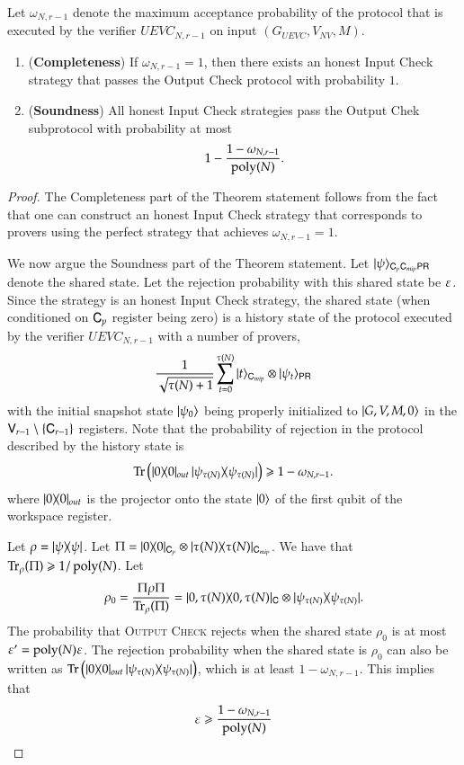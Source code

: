 \begin{lemma}	
\label{lem:output_check}
Let $\omega_{N,r-1}$ denote the maximum acceptance probability of the protocol that is executed by the verifier $UEVC_{N,r-1}$ on input $(G_{UEVC},V_{NV},M)$. 
\begin{enumerate}
	\item (\textbf{Completeness}) If $\omega_{N,r-1} = 1$, then there exists an honest Input Check strategy that passes the Output Check protocol with probability $1$.
	
	\item (\textbf{Soundness}) All honest Input Check strategies pass the Output Chek subprotocol with probability at most 
\[
	1 - \frac{1 - \omega_{N,r-1}}{\operatorname{poly}(N)}.
\] 
\end{enumerate}
\end{lemma}
\begin{proof}
The Completeness part of the Theorem statement follows from the fact that one can construct an honest Input Check strategy that corresponds to provers using the perfect strategy that achieves $\omega_{N,r-1} = 1$.

We now argue the Soundness part of the Theorem statement. Let $|\psi\rangle_{{\mathsf{C}}_p {\mathsf{C}}_{mip} {\mathsf{P}} {\mathsf{R}}}$ denote the shared state. Let the rejection probability with this shared state be $\varepsilon$. Since the strategy is an honest Input Check strategy, the shared state (when conditioned on ${\mathsf{C}}_p$ register being zero) is a history state of the protocol executed by the verifier $UEVC_{N,r-1}$ with a number of provers,
\[
\frac{1}{\sqrt{\tau(N) + 1}} \sum_{t = 0}^{\tau(N)} |t\rangle_{{\mathsf{C}}_{mip}} \otimes |\psi_t\rangle_{{\mathsf{P}} {\mathsf{R}}}
\]
with the initial snapshot state $|\psi_0\rangle$ being properly initialized to $|G,V,M,0\rangle$ in the ${\mathsf{V}}_{r-1} \setminus \{ {\mathsf{C}}_{r-1} \}$ registers. Note that the probability of rejection in the protocol described by the history state is 
\[
	\operatorname{Tr} \left ( |0\rangle\! \langle 0|_{out} \, |\psi_{\tau(N)}\rangle\! \langle \psi_{\tau(N)}| \right) \geqslant 1 - \omega_{N,r-1}.
\]
where $|0\rangle\! \langle 0|_{out}$ is the projector onto the state $|0\rangle$ of the first qubit of the workspace register.

Let $\rho = |\psi\rangle\! \langle \psi|$. Let $\Pi = |0\rangle\! \langle 0|_{{\mathsf{C}}_p} \otimes |\tau(N)\rangle\! \langle \tau(N)|_{{\mathsf{C}}_{mip}}$. We have that $\operatorname{Tr}_\rho (\Pi) \geqslant 1/\operatorname{poly}(N)$. Let
\[
\rho_0 = \frac{\Pi \rho \Pi}{\operatorname{Tr}_\rho (\Pi)} = |0,\tau(N)\rangle\! \langle 0,\tau(N)|_{{\mathsf{C}}} \otimes |\psi_{\tau(N)}\rangle\! \langle \psi_{\tau(N)}|.
\]
The probability that \textsc{Output Check} rejects when the shared state $\rho_0$ is at most $\varepsilon' = \operatorname{poly}(N) \varepsilon$. The rejection probability when the shared state is $\rho_0$ can also be written as $\operatorname{Tr} \left ( |0\rangle\! \langle 0|_{out} \, |\psi_{\tau(N)}\rangle\! \langle \psi_{\tau(N)}| \right)$, which is at least $1 - \omega_{N,r-1}$. This implies that
\[
	\varepsilon \geqslant \frac{1 - \omega_{N,r-1}}{\operatorname{poly}(N)}
\]


\end{proof}


